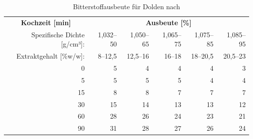 \documentclass[a4paper,parskip=half]{scrartcl}
\begin{document}
\begin{table}[H]
\centering
\begin{tabular}{rrrrrr} 
\toprule
\multicolumn{1}{c}{\textbf{Kochzeit [min]}} & \multicolumn{5}{c}{\textbf{Ausbeute [\%]}}                                 \\
Spezifische Dichte [g/cm³]:                    & 1,032–50 & 1,050–65 & 1,065–75 & 1,075–85 & 1,085–95  \\
Extraktgehalt [\%w/w]:                    & 8–12,5 & 12,5–16 & 16–18 & 18–20,5 & 20,5–23  \\
\midrule                                             
0                                            & 5        & 4        & 4                            & 4                            & 3                             \\
5                                            & 5        & 5        & 5                            & 4                            & 4                             \\
15                                           & 8        & 8        & 7                            & 7                            & 7                             \\
30                                           & 15       & 14       & 13                           & 13                           & 12                            \\
60                                           & 28       & 26       & 24                           & 23                           & 21                            \\
90                                           & 31       & 28       & 27                           & 26                           & 24                            \\
\bottomrule
\end{tabular}
\caption{Bitterstoffausbeute für Dolden nach \citeauthor{Noonan1996} \parencite[215]{Noonan1996}}
\label{table:noonanbakt}
\end{table}
\end{document}
